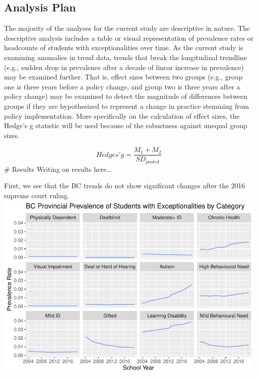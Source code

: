 \documentclass[
  english,
  man]{apa6}
\begin{document}
\hypertarget{analysis-plan}{%
\subsection{Analysis Plan}\label{analysis-plan}}

The majority of the analyses for the current study are descriptive in nature. The descriptive analysis includes a table or visual representation of prevalence rates or headcounts of students with exceptionalities over time. As the current study is examining anomalies in trend data, trends that break the longitudinal trendline (e.g., sudden drop in prevalence after a decade of linear increase in prevalence) may be examined further. That is, effect sizes between two groups (e.g., group one is three years before a policy change, and group two is three years after a policy change) may be examined to detect the magnitude of differences between groups if they are hypothesized to represent a change in practice stemming from policy implementation. More specifically on the calculation of effect sizes, the Hedge's g statistic will be used because of the robustness against unequal group sizes.

\[
Hedges' g = \frac{M_1 + M_2}{SD_{pooled}} 
\]
\# Results
Writing on results here\ldots{}

First, we see that the BC trends do not show significant changes after the 2016 supreme court ruling.
\includegraphics{Final_project_files/figure-latex/Provinical_Data_Overview-1.pdf}
\end{document}
